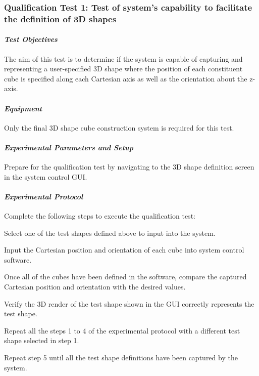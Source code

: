 \subsubsection*{Qualification Test 1: Test of system's capability to facilitate the definition of 3D shapes}

\paragraph{\textit{Test Objectives}} 

The aim of this test is to determine if the system is capable of capturing and representing a user-specified 3D shape where the position of each constituent cube is specified along each Cartesian axis as well as the orientation about the z-axis.

\paragraph{\textit{Equipment}} 

Only the final 3D shape cube construction system is required for this test.

\paragraph{\textit{Experimental Parameters and Setup}}

Prepare for the qualification test by navigating to the 3D shape definition screen in the system control GUI.

\paragraph{\textit{Experimental Protocol}}

Complete the following steps to execute the qualification test:

\begin{compactenum}
    \item Select one of the test shapes defined above to input into the system.
    \item Input the Cartesian position and orientation of each cube into system control software.
    \item Once all of the cubes have been defined in the software, compare the captured Cartesian position and orientation with the desired values.
    \item Verify the 3D render of the test shape shown in the GUI correctly represents the test shape.
    \item Repeat all the steps 1 to 4 of the experimental protocol with a different test shape selected in step 1.
    \item Repeat step 5 until all the test shape definitions have been captured by the system.
\end{compactenum}

